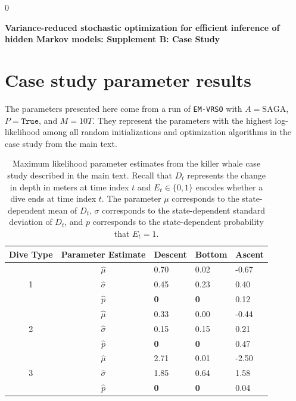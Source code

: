 \documentclass[12pt]{article}
\newcommand{\blind}{0}
\begin{document}
\blind
{
  \bigskip
  \bigskip
  \bigskip
  \begin{center}
    {\LARGE\bf Variance-reduced stochastic optimization for efficient inference of hidden Markov models: Supplement B: Case Study}
  \end{center}
  \medskip
} \fi


\section{Case study parameter results}

The parameters presented here come from a run of \texttt{EM-VRSO} with $A = \text{SAGA}$, $P = \texttt{True}$, and $M=10T$. They represent the parameters with the highest log-likelihood among all random initializations and optimization algorithms in the case study from the main text. 

\begin{table}[H]
\centering
\begin{tabular}{c|c|lll}
\multicolumn{1}{l|}{Dive Type} & Parameter Estimate & Descent & Bottom & Ascent \\ \hline
\multirow{3}{*}{1}            & $\hat \mu$     & 0.70    & 0.02   & -0.67  \\
                              & $\hat \sigma$  & 0.45    & 0.23   & 0.40   \\
                              & $\hat p$       & \bf{0}  & \bf{0} & 0.12   \\ \hline 
\multirow{3}{*}{2}            & $\hat \mu$     & 0.33    & 0.00   & -0.44  \\
                              & $\hat \sigma$  & 0.15    & 0.15   & 0.21   \\
                              & $\hat p$       & \bf{0}  & \bf{0} & 0.47   \\ \hline
\multirow{3}{*}{3}            & $\hat \mu$     & 2.71    & 0.01   & -2.50  \\
                              & $\hat \sigma$  & 1.85    & 0.64   & 1.58   \\
                              & $\hat p$       & \bf{0}  & \bf{0} & 0.04  
\end{tabular}
\caption{Maximum likelihood parameter estimates from the killer whale case study described in the main text. Recall that $D_t$ represents the change in depth in meters at time index $t$ and $E_t \in \{0,1\}$ encodes whether a dive ends at time index $t$. The parameter $\mu$ corresponds to the state-dependent mean of $D_t$, $\sigma$ corresponds to the state-dependent standard deviation of $D_t$, and $p$ corresponds to the state-dependent probability that $E_t=1$.}
\end{table}
\end{document}
